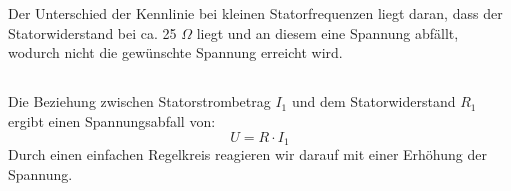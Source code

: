 \chapter{}\label{ex:aufg7}
%
\section{}\label{sec:aufg7a}

\section{}\label{sec:aufg7b}
Der Unterschied der Kennlinie bei kleinen Statorfrequenzen liegt daran, dass der Statorwiderstand bei ca. 25 $\Omega$ liegt und an diesem eine Spannung abfällt, wodurch nicht die gewünschte Spannung erreicht wird.
\section{}\label{sec:aufg7c}
Die Beziehung zwischen Statorstrombetrag $I_1$ und dem Statorwiderstand $R_1$ ergibt einen Spannungsabfall von:
\begin{equation}
	U = R \cdot I_1
\end{equation}
Durch einen einfachen Regelkreis reagieren wir darauf mit einer Erhöhung der Spannung. 
